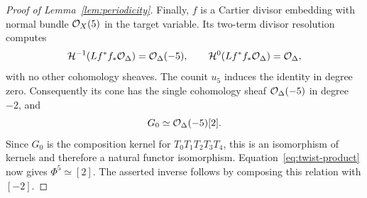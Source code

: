 \begin{proof}[Proof of Lemma~\ref{lem:periodicity}]
Finally, $f$ is a Cartier divisor embedding with normal bundle
$\mathcal O_X(5)$ in the target variable. Its two-term divisor resolution
computes
\[
 \mathcal H^{-1}(Lf^*f_*\mathcal O_\Delta)=\mathcal O_\Delta(-5),
 \qquad
 \mathcal H^0(Lf^*f_*\mathcal O_\Delta)=\mathcal O_\Delta,
\]
with no other cohomology sheaves. The counit $u_5$ induces the identity
in degree zero. Consequently its cone has the single cohomology sheaf
$\mathcal O_\Delta(-5)$ in degree $-2$, and
\[
 G_0\simeq\mathcal O_\Delta(-5)[2].
\]
Since $G_0$ is the composition kernel for $T_0T_1T_2T_3T_4$, this is
an isomorphism of kernels and therefore a natural functor isomorphism.
Equation~\eqref{eq:twist-product} now gives $\Phi^5\simeq[2]$.
The asserted inverse follows by composing this relation with $[-2]$.
\end{proof}
